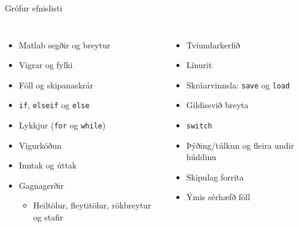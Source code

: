 \documentclass[handout]{beamer}
\begin{document}
\begin{frame}{Grófur efnislisti}
\begin{columns}
\begin{itemize}
 \item Matlab segðir og breytur
 \item Vigrar og fylki
 \item Föll og skipanaskrár
 \item \texttt{if}, \texttt{elseif} og \texttt{else}
 \item Lykkjur (\texttt{for} og \texttt{while})
 \item Vigurkóðun
 \item Inntak og úttak
 \item Gagnagerðir
 \begin{itemize}
  \item Heiltölur, fleytitölur, rökbreytur og stafir
 \end{itemize}
\end{itemize}
\begin{itemize}
 \item Tvíundarkerfið
 \item Línurit
 \item Skráarvinnsla: \texttt{save} og \texttt{load}
 \item Gildissvið breyta
 \item \texttt{switch}
 \item Þýðing/túlkun og fleira undir húddinu
 \item Skipulag forrita
 \item Ýmis sérhæfð föll
\end{itemize}
\end{columns}
\end{frame}
\end{document}
